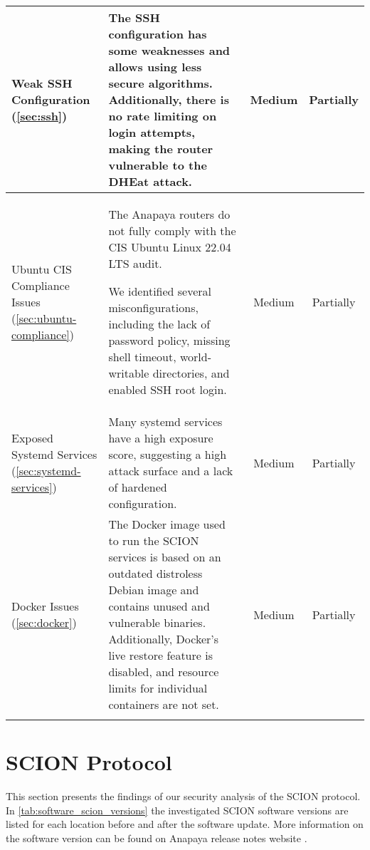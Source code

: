 \begin{tabularx}{\textwidth}{|C{3cm}|X|c|c|}
    Weak SSH Configuration (\cref{sec:ssh}) &
    The SSH configuration has some weaknesses and allows using less secure algorithms.
    Additionally, there is no rate limiting on login attempts, making the router vulnerable to the DHEat attack. &
    Medium &
    Partially
    \\ \hline

    Ubuntu CIS Compliance Issues (\cref{sec:ubuntu-compliance}) &
    The Anapaya routers do not fully comply with the CIS Ubuntu Linux 22.04 LTS audit.

    We identified several misconfigurations, including the lack of password policy, missing shell timeout, world-writable directories, and enabled SSH root login. &
    Medium &
    Partially
    \\ \hline

    Exposed Systemd Services (\cref{sec:systemd-services}) &
    Many systemd services have a high exposure score, suggesting a high attack surface and a lack of hardened configuration. &
    Medium &
    Partially
    \\ \hline

    Docker Issues (\cref{sec:docker}) &
    The Docker image used to run the SCION services is based on an outdated distroless Debian image and contains unused and vulnerable binaries.
    Additionally, Docker's live restore feature is disabled, and resource limits for individual containers are not set. &
    Medium &
    Partially
    \\ \hline


    \caption{Summary of Findings}
    \label{tab:findings_summary}
\end{tabularx}



\section{SCION Protocol}
\label{sec:findings:scion-protocol}
This section presents the findings of our security analysis of the SCION protocol.
In \cref{tab:software_scion_versions} the investigated SCION software versions are listed for each location before and after the software update.
More information on the software version can be found on Anapaya release notes website \cite{anapayaApplianceReleases}.

